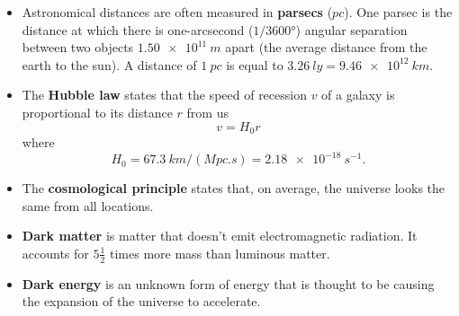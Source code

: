 \documentclass{article}
\begin{document}
\begin{itemize}
  \item Astronomical distances are often measured in \textbf{parsecs} ($\unit{pc}$). One parsec is the distance at which there is one-arcsecond ($1 / \ang{3600}$) angular separation between two objects $\qty{1.50e11}{m}$ apart (the average distance from the earth to the sun). A distance of $\qty{1}{pc}$ is equal to $\qty{3.26}{ly} = \qty{9.46e12}{km}$.

  \item The \textbf{Hubble law} states that the speed of recession $v$ of a galaxy is proportional to its distance $r$ from us \[v = H_0 r\] where \[H_0 = \qty{67.3}{km/(Mpc.s)} = \qty{2.18e-18}{s^{-1}}.\]

  \item The \textbf{cosmological principle} states that, on average, the universe looks the same from all locations.

  \item \textbf{Dark matter} is matter that doesn't emit electromagnetic radiation. It accounts for $5 \frac{1}{2}$ times more mass than luminous matter.

  \item \textbf{Dark energy} is an unknown form of energy that is thought to be causing the expansion of the universe to accelerate.
\end{itemize}
\end{document}
